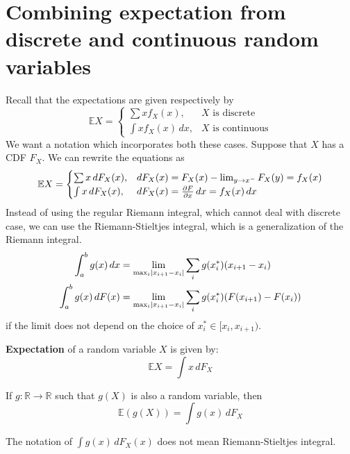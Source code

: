 \documentclass{huhtakm-template-book}
\newcommand{\expect}{\mathbb{E}}
\begin{document}
\section{Combining expectation from discrete and continuous random variables}
Recall that the expectations are given respectively by
\begin{equation*}
	\expect X=\begin{cases}
		\sum xf_{X}(x), &X\text{ is discrete}\\
		\int xf_{X}(x)\,dx, &X\text{ is continuous}
	\end{cases}
\end{equation*}
We want a notation which incorporates both these cases. Suppose that $X$ has a CDF $F_{X}$. We can rewrite the equations as
\begin{equation*}
	\expect X=\begin{cases}
		\sum x\,dF_{X}(x), &dF_{X}(x)=F_{X}(x)-\lim_{y\to x^{-}}F_{X}(y)=f_{X}(x)\\
		\int x\,dF_{X}(x), &dF_{X}(x)=\pdv{F}{x}\,dx=f_{X}(x)\,dx
	\end{cases}
\end{equation*}
Instead of using the regular Riemann integral, which cannot deal with discrete case, we can use the Riemann-Stieltjes integral, which is a generalization of the Riemann integral.
\begin{align*}
	\int_{a}^{b}g(x)\,dx&=\lim_{\max_{i}\left|{x_{i+1}-x_{i}}\right|}\sum_{i}g(x_{i}^{*})(x_{i+1}-x_{i})\\
	\int_{a}^{b}g(x)\,dF(x)&=\lim_{\max_{i}\left|{x_{i+1}-x_{i}}\right|}\sum_{i}g(x_{i}^{*})(F(x_{i+1})-F(x_{i}))
\end{align*}
if the limit does not depend on the choice of $x_{i}^{*}\in[x_{i},x_{i+1})$.
\begin{defn}
	\textbf{Expectation} of a random variable $X$ is given by:
	\begin{equation*}
		\expect X=\int x\,dF_{X}
	\end{equation*}
\end{defn}
\begin{lem}
	If $g:\mathbb{R}\to\mathbb{R}$ such that $g(X)$ is also a random variable, then
	\begin{equation*}
		\expect(g(X))=\int g(x)\,dF_{X}
	\end{equation*}
\end{lem}
\begin{rem}
	The notation of $\int g(x)\,dF_{X}(x)$ does not mean Riemann-Stieltjes integral.
\end{rem}
\end{document}
